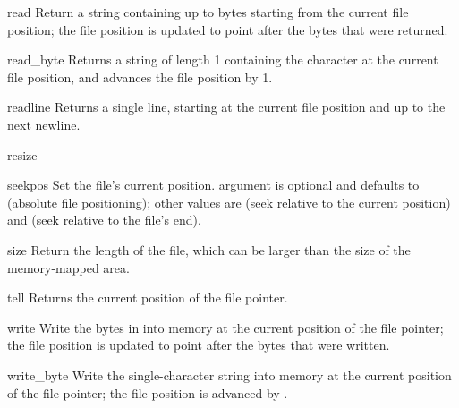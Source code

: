 \begin{methoddesc}{read}{}
Return a string containing up to  bytes starting from the
current file position; the file position is updated to point after the
bytes that were returned. 
\end{methoddesc}

\begin{methoddesc}{read_byte}{}
Returns a string of length 1 containing the character at the current
file position, and advances the file position by 1.
\end{methoddesc}

\begin{methoddesc}{readline}{}
Returns a single line, starting at the current file position and up to 
the next newline.
\end{methoddesc}

\begin{methoddesc}{resize}{}
\end{methoddesc}

\begin{methoddesc}{seek}{pos}
Set the file's current position.
 argument is optional and defaults to  (absolute
file positioning); other values are  (seek relative to the
current position) and  (seek relative to the file's end).
\end{methoddesc}

\begin{methoddesc}{size}{}
Return the length of the file, which can be larger than the size
of the memory-mapped area. 
\end{methoddesc}

\begin{methoddesc}{tell}{}
Returns the current position of the file pointer.
\end{methoddesc}

\begin{methoddesc}{write}{}
Write the bytes in  into memory at the current position of
the file pointer; the file position is updated to point after the
bytes that were written. 
\end{methoddesc}

\begin{methoddesc}{write_byte}{}
Write the single-character string  into memory at the
current position of the file pointer; the file position is advanced by
.
\end{methoddesc}
